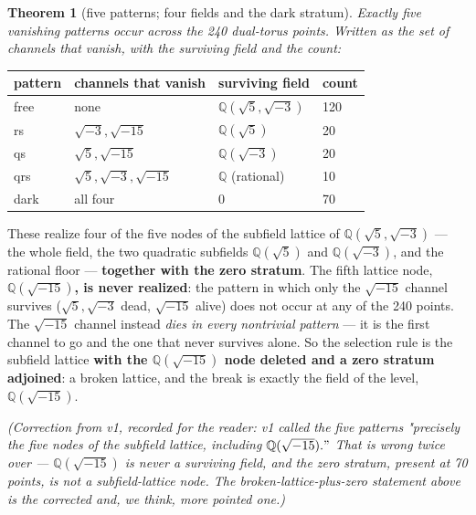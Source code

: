 \documentclass[11pt]{article}
\theoremstyle{plain}
\newtheorem{theorem}{Theorem}[section]
\theoremstyle{definition}
\theoremstyle{remark}
\begin{document}
\begin{theorem}[five patterns; four fields and the dark stratum]
Exactly five vanishing patterns occur across the 240 dual-torus points. Written as the set of channels that vanish, with the surviving field and the count:
\end{theorem}

\begin{center}\small\begin{tabular}{llll}\hline

\textbf{pattern} & \textbf{channels that vanish} & \textbf{surviving field} & \textbf{count} \\ \hline

free & none & \(\mathbb{Q}(\sqrt{5},\sqrt{-3})\) & 120 \\

rs & \(\sqrt{-3}, \sqrt{-15}\) & \(\mathbb{Q}(\sqrt{5})\) & 20 \\

qs & \(\sqrt{5}, \sqrt{-15}\) & \(\mathbb{Q}(\sqrt{-3})\) & 20 \\

qrs & \(\sqrt{5}, \sqrt{-3}, \sqrt{-15}\) & \(\mathbb{Q}\) (rational) & 10 \\

dark & all four & 0 & 70 \\

\hline\end{tabular}\end{center}

These realize four of the five nodes of the subfield lattice of \(\mathbb{Q}(\sqrt{5},\sqrt{-3})\) — the whole field, the two quadratic subfields \(\mathbb{Q}(\sqrt{5})\) and \(\mathbb{Q}(\sqrt{-3})\), and the rational floor — \textbf{together with the zero stratum}. The fifth lattice node, \textbf{\(\mathbb{Q}(\sqrt{-15})\), is never realized}: the pattern in which only the \(\sqrt{-15}\) channel survives (\(\sqrt{5}, \sqrt{-3}\) dead, \(\sqrt{-15}\) alive) does not occur at any of the 240 points. The \(\sqrt{-15}\) channel instead \emph{dies in every nontrivial pattern} — it is the first channel to go and the one that never survives alone. So the selection rule is the subfield lattice \textbf{with the \(\mathbb{Q}(\sqrt{-15})\) node deleted and a zero stratum adjoined}: a broken lattice, and the break is exactly the field of the level, \(\mathbb{Q}(\sqrt{-15})\).

\emph{(Correction from v1, recorded for the reader: v1 called the five patterns "precisely the five nodes of the subfield lattice, including \(\mathbb{Q}(\sqrt{-15})."\) That is wrong twice over — \(\mathbb{Q}(\sqrt{-15})\) is never a surviving field, and the zero stratum, present at 70 points, is not a subfield-lattice node. The broken-lattice-plus-zero statement above is the corrected and, we think, more pointed one.)}
\end{document}
